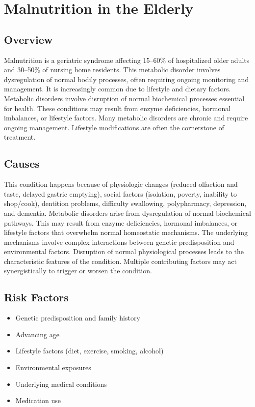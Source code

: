 \chapter{Malnutrition in the Elderly}
\label{sec:Malnutrition in the Elderly}

\section{Overview}
Malnutrition is a geriatric syndrome affecting 15--60\% of hospitalized older adults and 30--50\% of nursing home residents. This metabolic disorder involves dysregulation of normal bodily processes, often requiring ongoing monitoring and management. It is increasingly common due to lifestyle and dietary factors. Metabolic disorders involve disruption of normal biochemical processes essential for health. These conditions may result from enzyme deficiencies, hormonal imbalances, or lifestyle factors. Many metabolic disorders are chronic and require ongoing management. Lifestyle modifications are often the cornerstone of treatment.
\section{Causes}
This condition happens because of physiologic changes (reduced olfaction and taste, delayed gastric emptying), social factors (isolation, poverty, inability to shop/cook), dentition problems, difficulty swallowing, polypharmacy, depression, and dementia. Metabolic disorders arise from dysregulation of normal biochemical pathways. This may result from enzyme deficiencies, hormonal imbalances, or lifestyle factors that overwhelm normal homeostatic mechanisms. The underlying mechanisms involve complex interactions between genetic predisposition and environmental factors. Disruption of normal physiological processes leads to the characteristic features of the condition. Multiple contributing factors may act synergistically to trigger or worsen the condition.
\section{Risk Factors}
\begin{itemize}[noitemsep]
  \item Genetic predisposition and family history
  \item Advancing age
  \item Lifestyle factors (diet, exercise, smoking, alcohol)
  \item Environmental exposures
  \item Underlying medical conditions
  \item Medication use
\end{itemize}
